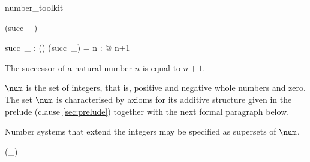 \documentclass[draft,a4paper,10pt,wd]{isov2}
\begin{document}

\begin{zsection}
\SECTION number\_toolkit
\end{zsection}


\begin{zed}
\function (succ~\_)
\end{zed}

\begin{axdef}
succ~\_ : \power (\nat \cross \nat)
\where
(succ~\_) = \lambda n : \nat @ n+1
\end{axdef}

The successor of a natural number $n$ is equal to $n+1$.


\begin{axdef}
\num : \power \arithmos
\end{axdef}

$\num$ is the set of integers,
that is, positive and negative whole numbers and zero.
The set $\num$ is characterised by axioms for its additive structure given
in the prelude (clause \ref{sec:prelude}) together with
the next formal paragraph below.

Number systems that extend the integers
may be specified as supersets of $\num$.


\begin{zed}
\function (\negate \_)
\end{zed}

\end{document}
